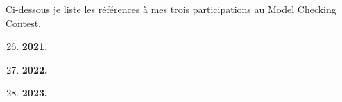 Ci-dessous je liste les références à mes trois participations au Model Checking Contest.
\vspace{10pt}
\begin{enumerate}
  \setcounter{enumi}{25}
  \item \textbf{2021.} \smallbreak
  \item \textbf{2022.} \smallbreak
  \item \textbf{2023.} 
\end{enumerate}
